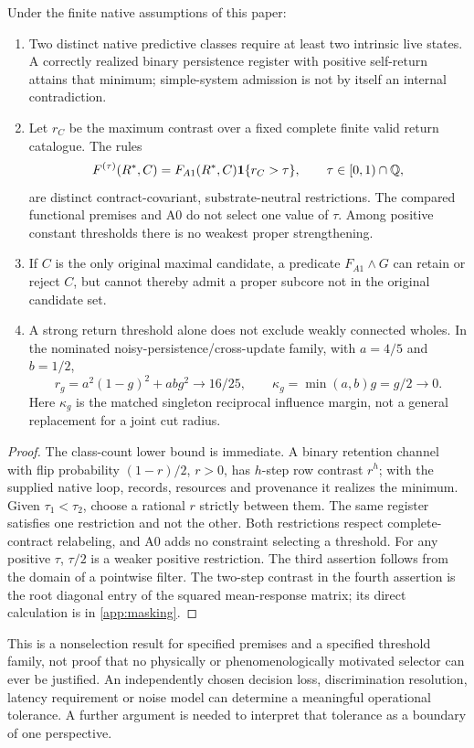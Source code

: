 \begin{proposition}\label{p2-05}
Under the finite native assumptions of this paper:
\begin{enumerate}[label=(\roman*),leftmargin=2em]
\item Two distinct native predictive classes require at least two intrinsic live states. A correctly realized binary persistence register with positive self-return attains that minimum; simple-system admission is not by itself an internal contradiction.
\item Let \(r_C\) be the maximum contrast over a fixed complete finite valid return catalogue. The rules
\begin{equation}\label{eq:threshold-rules}
 F^{(\tau)}(R^{\ast},C)=F_{A1}(R^{\ast},C)\mathbf 1\{r_C>\tau\},
 \qquad\tau\in[0,1)\cap\mathbb Q,
\end{equation}
are distinct contract-covariant, substrate-neutral restrictions. The compared functional premises and A0 do not select one value of \(\tau\). Among positive constant thresholds there is no weakest proper strengthening.
\item If \(C\) is the only original maximal candidate, a predicate \(F_{A1}\land G\) can retain or reject \(C\), but cannot thereby admit a proper subcore not in the original candidate set.
\item A strong return threshold alone does not exclude weakly connected wholes. In the nominated noisy-persistence/cross-update family, with \(a=4/5\) and \(b=1/2\),
\begin{equation}\label{eq:return-vs-cut}
 r_g=a^2(1-g)^2+abg^2\longrightarrow16/25,
 \qquad \kappa_g=\min(a,b)g=g/2\longrightarrow0.
\end{equation}
Here \(\kappa_g\) is the matched singleton reciprocal influence margin, not a general replacement for a joint cut radius.
\end{enumerate}
\end{proposition}
\begin{proof}
The class-count lower bound is immediate. A binary retention channel with flip probability \((1-r)/2\), \(r>0\), has \(h\)-step row contrast \(r^h\); with the supplied native loop, records, resources and provenance it realizes the minimum. Given \(\tau_1<\tau_2\), choose a rational \(r\) strictly between them. The same register satisfies one restriction and not the other. Both restrictions respect complete-contract relabeling, and A0 adds no constraint selecting a threshold. For any positive \(\tau\), \(\tau/2\) is a weaker positive restriction. The third assertion follows from the domain of a pointwise filter. The two-step contrast in the fourth assertion is the root diagonal entry of the squared mean-response matrix; its direct calculation is in \cref{app:masking}.
\end{proof}
This is a nonselection result for specified premises and a specified threshold family, not proof that no physically or phenomenologically motivated selector can ever be justified. An independently chosen decision loss, discrimination resolution, latency requirement or noise model can determine a meaningful operational tolerance. A further argument is needed to interpret that tolerance as a boundary of one perspective.

